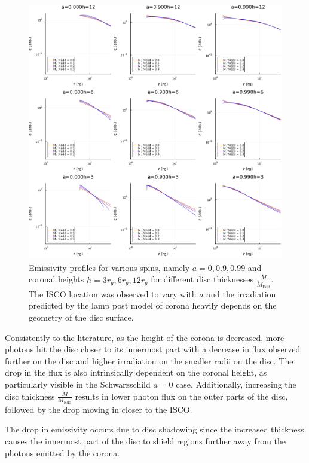\documentclass[fleqn,usenatbib,useAMS]{mnras}
\begin{document}
\begin{figure}
    \centering
    \includegraphics[width=\linewidth]{figures/profiletest.png}
    \caption{Emissivity profiles for various spins, namely $a = 0, 0.9, 0.99$ and coronal heights $h = 3 r_{g}, 6 r_{g}, 12 r_{g}$ for different disc thicknesses $\frac{\dot{M}}{\dot{M}_\text{Edd}}$. The ISCO location was observed to vary with $a$ and the irradiation predicted by the lamp post model of corona heavily depends on the geometry of the disc surface.}
    \label{profiletest}
\end{figure}

Consistently to the literature, as the height of the corona is decreased, more photons hit the disc closer to its innermost part with a decrease in flux observed further on the disc and higher irradiation on the smaller radii on the disc. The drop in the flux is also intrinsically dependent on the coronal height, as particularly visible in the Schwarzschild $a = 0$ case. Additionally, increasing the disc thickness $\frac{\dot M}{M_{\text{Edd}}}$ results in lower photon flux on the outer parts of the disc, followed by the drop moving in closer to the ISCO. 

The drop in emissivity occurs due to disc shadowing \cite{taylor2018exploring} since the increased thickness causes the innermost part of the disc to shield regions further away from the photons emitted by the corona.
\end{document}
